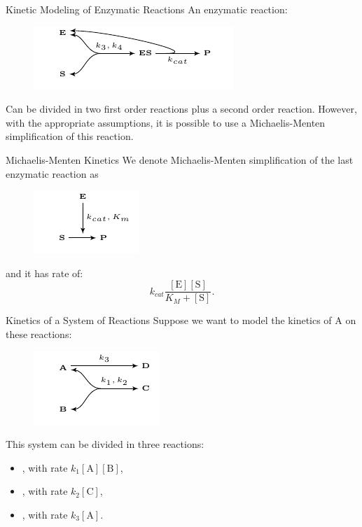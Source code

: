 \documentclass{beamer}
\begin{document}
\begin{frame}{Kinetic Modeling of Enzymatic Reactions}
An enzymatic reaction:
\begin{figure}
\includegraphics[scale=1.5]{fundamental_concepts/enzymatic_reaction.pdf}
\end{figure}
\pause
Can be divided in two first order reactions plus a second order 
reaction.
\pause
However, with the appropriate assumptions, it is possible to use a 
Michaelis-Menten simplification of this reaction.
\end{frame}


\begin{frame}{Michaelis-Menten Kinetics}
We denote Michaelis-Menten simplification of the last enzymatic reaction
as
\begin{figure}
\includegraphics[scale=1.5]{fundamental_concepts/michaelis_menten_reaction.pdf}
\end{figure}
\pause
and it has rate of:
\begin{equation*}
    k_{cat} \frac{[\text{E}][\text{S}]}{K_M + [\text{S}]}.
\end{equation*}
\end{frame}


\begin{frame}{Kinetics of a System of Reactions}
Suppose we want to model the kinetics of A on these reactions:
\begin{figure}
    \includegraphics[scale=1.5]{fundamental_concepts/system_reactions.pdf}
\end{figure}
This system can be divided in three reactions:
\begin{itemize}
    \pause
    \item{, with rate $k_1[\text{A}][\text{B}]$,}
    \pause
    \item{, with rate $k_2[\text{C}]$,}
    \pause
    \item{, with rate $k_3[\text{A}]$.}
\end{itemize}
\end{frame}
\end{document}
